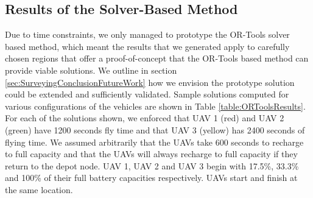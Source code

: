 \subsection{Results of the Solver-Based Method}

Due to time constraints, we only managed to prototype the OR-Tools solver based method, which meant the results that we generated apply to carefully chosen regions that offer a proof-of-concept that the OR-Tools based method can provide viable solutions. We outline in section \ref{sec:SurveyingConclusionFutureWork} how we envision the prototype solution could be extended and sufficiently validated. Sample solutions computed for various configurations of the vehicles are shown in Table \ref{table:ORToolsResults}. For each of the solutions shown, we enforced that UAV 1 (red) and UAV 2 (green) have 1200 seconds fly time and that UAV 3 (yellow) has 2400 seconds of flying time. We assumed arbitrarily that the UAVs take 600 seconds to recharge to full capacity and that the UAVs will always recharge to full capacity if they return to the depot node. UAV 1, UAV 2 and UAV 3 begin with 17.5\%, 33.3\% and 100\% of their full battery capacities respectively. UAVs start and finish at the same location.

